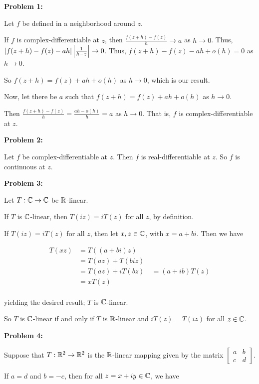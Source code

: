 \documentclass[a4paper,12pt]{article}
\begin{document}
{\bf Problem 1:}

Let $f$ be defined in a neighborhood around $z$.

If $f$ is complex-differentiable at $z$, then $\frac{f(z+h) - f(z)}{h} \to a$ as $h \to 0$. Thus, $\left\lvert f(z+h) - f(z) - ah \right\rvert\left\lvert \frac{1}{h-z} \right\rvert \to 0$. Thus, $f(z+h) - f(z) - ah + o(h) = 0$ as $h \to 0$.

So $f(z+h) = f(z) + ah+ o(h)$ as $h \to 0$, which is our result.

Now, let there be $a$ such that $f(z+h) = f(z) + ah + o(h)$ as $h \to 0$.

Then $\frac{f(z+h) - f(z)}{h} = \frac{ah - o(h)}{h} = a$ as $h \to 0$. That is, $f$ is complex-differentiable at $z$. 

\shunt

{\bf Problem 2:}

Let $f$ be complex-differentiable at $z$. Then $f$ is real-differentiable at $z$. So $f$ is continuous at $z$.

\shunt

{\bf Problem 3:}

Let $T: \mathbb{C} \to \mathbb{C}$ be $\mathbb{R}$-linear.

If $T$ is $\mathbb{C}$-linear, then $T(iz) = iT(z)$ for all $z$, by definition.

If $T(iz) = iT(z)$ for all $z$, then let $x,z \in \mathbb{C}$, with $x = a+bi$. Then we have

\begin{align*}
T(xz) &= T((a+bi)z)\\
&= T(az) + T(biz)\\
&= T(az) + iT(bz)\
&= (a+ib)T(z)\\
&= xT(z)\\
\end{align*}

yielding the desired result; $T$ is $\mathbb{C}$-linear.

So $T$ is $\mathbb{C}$-linear if and only if $T$ is $\mathbb{R}$-linear and $iT(z) = T(iz)$ for all $z \in \mathbb{C}$. 

\shunt

{\bf Problem 4:} %

Suppose that $T: \mathbb{R}^2 \to \mathbb{R}^2$ is the $\mathbb{R}$-linear mapping given by the matrix $\left[\begin{smallmatrix} a&b\\ c&d \end{smallmatrix}\right]$.

If $a=d$ and $b=-c$, then for all $z = x+iy \in \mathbb{C}$, we have
\end{document}

